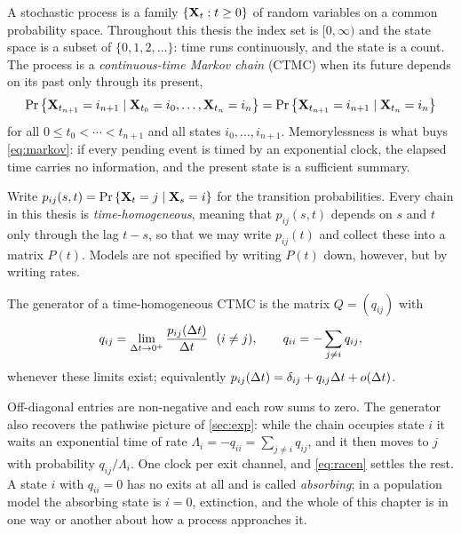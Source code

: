 A stochastic process is a family $\{{{\bf X}_t} : t\ge0\}$ of random variables on a common
probability space. Throughout this thesis the index set is $[0,\infty)$ and the state
space is a subset of $\{0,1,2,\dots\}$: time runs continuously, and the state is a
count. The process is a \emph{continuous-time Markov chain} (CTMC) when its future
depends on its past only through its present,
\begin{equation}
\label{eq:markov}
{\text{Pr}\left\{{\bf X}_{t_{n+1}} = i_{n+1} \mid {\bf X}_{t_0}=i_0,\dots,{\bf X}_{t_n}=i_n\right\}}
= {\text{Pr}\left\{{\bf X}_{t_{n+1}} = i_{n+1} \mid {\bf X}_{t_n}=i_n\right\}}
\end{equation}
for all $0\le t_0<\cdots<t_{n+1}$ and all states $i_0,\dots,i_{n+1}$. Memorylessness is
what buys \cref{eq:markov}: if every pending event is timed by an exponential clock,
the elapsed time carries no information, and the present state is a sufficient summary.

Write $p_{ij}(s,t) = {\text{Pr}\left\{{{\bf X}_t}=j\mid{{\bf X}_s}=i\right\}}$ for the transition probabilities. Every chain
in this thesis is \emph{time-homogeneous}, meaning that $p_{ij}(s,t)$ depends on $s$ and
$t$ only through the lag $t-s$, so that we may write $p_{ij}(t)$ and collect these into
a matrix $P(t)$. Models are not specified by writing $P(t)$ down, however, but by
writing rates.

\begin{definition}
\label{def:generator}
The generator of a time-homogeneous CTMC is the matrix $Q=(q_{ij})$ with
\begin{equation}
\label{eq:generator}
q_{ij} = \lim_{\Delta t\to0^+}\frac{p_{ij}(\Delta t)}{\Delta t}\ \ (i\neq j),
\qquad
q_{ii} = -\sum_{j\neq i}q_{ij},
\end{equation}
whenever these limits exist; equivalently
$p_{ij}(\Delta t) = \delta_{ij} + q_{ij}\Delta t + o(\Delta t)$.
\end{definition}

\noindent
Off-diagonal entries are non-negative and each row sums to zero. The generator also
recovers the pathwise picture of \cref{sec:exp}: while the chain occupies state $i$ it
waits an exponential time of rate $\Lambda_i = -q_{ii} = \sum_{j\neq i}q_{ij}$, and it
then moves to $j$ with probability $q_{ij}/\Lambda_i$. One clock per exit channel, and
\cref{eq:racen} settles the rest. A state $i$ with $q_{ii}=0$ has no exits at all and is
called \emph{absorbing}; in a population model the absorbing state is $i=0$, extinction,
and the whole of this chapter is in one way or another about how a process approaches
it.


